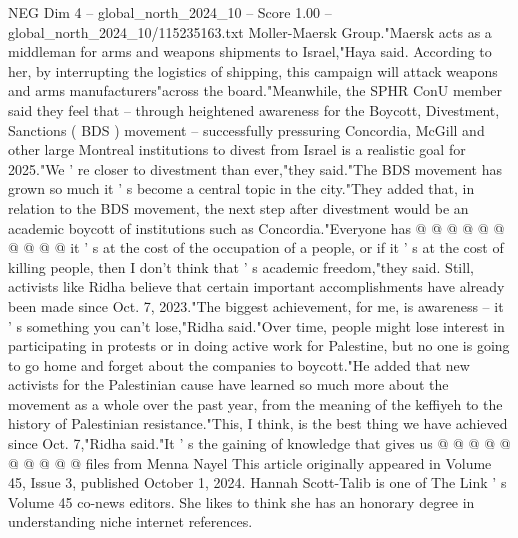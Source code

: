 \begin{textsample}{NEG Dim 4 – global\_north\_2024\_10 – Score 1.00 – global\_north\_2024\_10/115235163.txt}
Moller-Maersk Group."Maersk acts as a middleman for arms and weapons shipments to Israel,"Haya said.
According to her, by interrupting the logistics of shipping, this campaign will attack weapons and arms manufacturers"across the board."Meanwhile, the SPHR ConU member said they feel that -- through heightened awareness for the Boycott, Divestment, Sanctions ( BDS ) movement -- successfully pressuring Concordia, McGill and other large Montreal institutions to divest from Israel is a realistic goal for 2025."We ' re closer to divestment than ever,"they said."The BDS movement has grown so much it ' s become a central topic in the city."They added that, in relation to the BDS movement, the next step after divestment would be an academic boycott of institutions such as Concordia."Everyone has @ @ @ @ @ @ @ @ @ @ it ' s at the cost of the occupation of a people, or if it ' s at the cost of killing people, then I don't think that ' s academic freedom,"they said.
Still, activists like Ridha believe that certain important accomplishments have already been made since Oct. 7, 2023."The biggest achievement, for me, is awareness -- it ' s something you can't lose,"Ridha said."Over time, people might lose interest in participating in protests or in doing active work for Palestine, but no one is going to go home and forget about the companies to boycott."He added that new activists for the Palestinian cause have learned so much more about the movement as a whole over the past year, from the meaning of the keffiyeh to the history of Palestinian resistance."This, I think, is the best thing we have achieved since Oct. 7,"Ridha said."It ' s the gaining of knowledge that gives us @ @ @ @ @ @ @ @ @ @ files from Menna Nayel This article originally appeared in Volume 45, Issue 3, published October 1, 2024.
Hannah Scott-Talib is one of The Link ' s Volume 45 co-news editors.
She likes to think she has an honorary degree in understanding niche internet references.

\end{textsample}
